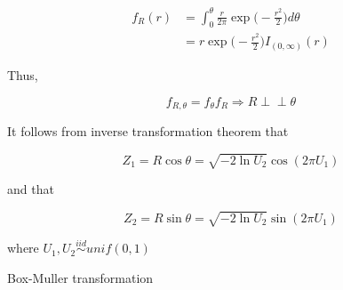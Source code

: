 \documentclass[]{book}
\theoremstyle{definition}
\theoremstyle{definition}
\theoremstyle{definition}
\theoremstyle{remark}
\begin{document}
\begin{equation*}
  \begin{split}
    f_R(r) & = \int_0^\theta \frac{r}{2\pi}\exp\bigg(-\frac{r^2}{2}\bigg) d\theta \\
    & = r \exp\bigg(-\frac{r^2}{2}\bigg) I_{(0, \infty)}(r)
  \end{split}
\end{equation*}

Thus,

\[f_{R,\theta} = f_{\theta}f_R \Rightarrow R \perp\!\!\!\perp\theta\]

It follows from inverse transformation theorem that

\[Z_1 = R\cos\theta = \sqrt{-2 \ln U_2} \cos(2\pi U_1)\]

and that

\[Z_2 = R\sin\theta = \sqrt{-2 \ln U_2} \sin(2\pi U_1)\]

where \(U_1, U_2 \stackrel{iid}{\sim}unif(0, 1)\)

\begin{algorithm}[H] \label{alg:algbm}
  \SetAlgoLined
  \caption{Box-Muller transformation}
\end{algorithm}
\end{document}
